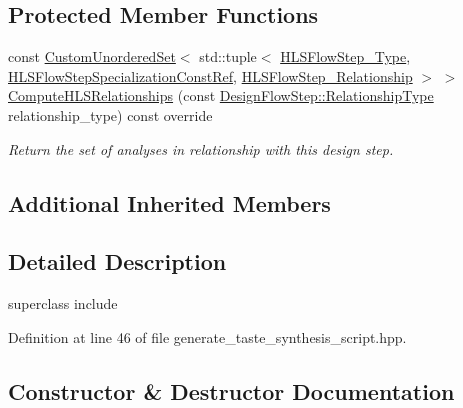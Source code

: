 \subsection*{Protected Member Functions}
\begin{DoxyCompactItemize}
\item 
const \hyperlink{classCustomUnorderedSet}{Custom\+Unordered\+Set}$<$ std\+::tuple$<$ \hyperlink{hls__step_8hpp_ada16bc22905016180e26fc7e39537f8d}{H\+L\+S\+Flow\+Step\+\_\+\+Type}, \hyperlink{hls__step_8hpp_a5fdd2edf290c196531d21d68e13f0e74}{H\+L\+S\+Flow\+Step\+Specialization\+Const\+Ref}, \hyperlink{hls__step_8hpp_a3ad360b9b11e6bf0683d5562a0ceb169}{H\+L\+S\+Flow\+Step\+\_\+\+Relationship} $>$ $>$ \hyperlink{classGenerateTasteSynthesisScript_a1100f2d9ab2b4d5cc3ae87ef751c9097}{Compute\+H\+L\+S\+Relationships} (const \hyperlink{classDesignFlowStep_a723a3baf19ff2ceb77bc13e099d0b1b7}{Design\+Flow\+Step\+::\+Relationship\+Type} relationship\+\_\+type) const override
\begin{DoxyCompactList}\small\item\em Return the set of analyses in relationship with this design step. \end{DoxyCompactList}\end{DoxyCompactItemize}
\subsection*{Additional Inherited Members}


\subsection{Detailed Description}
superclass include 

Definition at line 46 of file generate\+\_\+taste\+\_\+synthesis\+\_\+script.\+hpp.



\subsection{Constructor \& Destructor Documentation}
\mbox{\label{classGenerateTasteSynthesisScript_a83f8f31d125253e6a8298a03ee2863ed}} 
